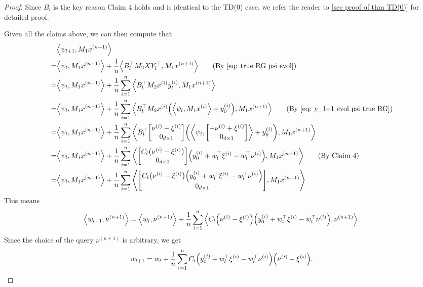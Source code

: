 \documentclass{article}
\newcommand{\explain}[1]{\tag*{(#1)}}
\newcommand{\indot}[2]{{\left<#1, #2\right>}}
\begin{document}
\begin{proof}
    Since $B_l$ is the key reason Claim 4 holds and is identical to the TD(0) case, we refer the reader to \ref{sec proof of thm TD(0)} for detailed proof.

     Given all the claims above,
    we can then compute that
    \begin{align}
        &\indot{\psi_{l+1}}{M_1 x^{(n+1)}}\\ 
        =&\indot{\psi_l}{M_1 x^{(n+1)}} + \frac{1}{n}\indot{B_l^\top M_2 X Y_l^\top}{M_1 x^{(n+1)}} \explain{By~\eqref{eq: true RG psi evol}}\\
        =&\indot{\psi_l}{M_1 x^{(n+1)}} + \frac{1}{n}\sum_{i=1}^n \indot{B_l^\top M_2 x^{(i)} y_l^{(i)}}{M_1 x^{(n+1)}}\\
        =&\indot{\psi_l}{M_1 x^{(n+1)}} + 
        \frac{1}{n} \sum_{i=1}^n \indot{B_l^\top M_2 x^{(i)} \qty(\indot{\psi_l}{M_1 x^{(i)}} + y_0^{(i)})}{M_1 x^{(n+1)}} \explain{By \eqref{eq: y_l+1 evol psi true RG}}\\
        =&\indot{\psi_l}{M_1 x^{(n+1)}} + 
        \frac{1}{n} \sum_{i=1}^n 
        \indot{B_l^\top \mqty[\nu^{(i)} - \xi^{(i)} \\
                              0_{d\times 1}] 
        \qty( \indot{\psi_l}{\mqty[-\nu^{(i)} + \xi^{(i)}\\ 0_{d\times 1}]} + y_0^{(i)})}{M_1 x^{(n+1)}}\\
        =&\indot{\psi_l}{M_1 x^{(n+1)}} + 
        \frac{1}{n} \sum_{i=1}^n 
        \indot{\mqty[C_l\qty(\nu^{(i)}- \xi^{(i)})\\
                     0_{d\times 1}] 
        \qty( y_0^{(i)} +  w_l^\top \xi^{(i)} - w_l^\top \nu^{(i)} )}{M_1 x^{(n+1)}} \explain{By Claim 4}\\
        =&\indot{\psi_l}{M_1 x^{(n+1)}} + 
        \frac{1}{n} \sum_{i=1}^n 
        \indot{\mqty[C_l \qty(\nu^{(i)}-\xi^{(i)} ) \qty(y_0^{(i)} + w_l^\top \xi^{(i)} - w_l^\top \nu^{(i)})\\0_{d\times 1}]}
        {M_1 x^{(n+1)}}\\
    \end{align}
    This means
    \begin{align}
        \indot{w_{l+1}}{\nu^{(n+1)}} 
        = \indot{w_l}{\nu^{(n+1)}}
        + \frac{1}{n} \sum_{i=1}^n 
        \indot{C_l \qty(\nu^{(i)}-\xi^{(i)}) \qty(y_0^{(i)} + w_l^\top \xi^{(i)} - w_l^\top \nu^{(i)})}{
        \nu^{(n+1)}}.
    \end{align}
    Since the choice of the query $\nu^{(n+1)}$ is arbitrary, we get 
    \begin{align}
        w_{l+1} = w_l + \frac{1}{n}\sum_{i=1}^n C_l \qty(y_0^{(i)} + w_l^\top \xi^{(i)} - w_l^\top \nu^{(i)}) \qty(\nu^{(i)}- \xi^{(i)}).
    \end{align}


\end{proof}
\end{document}
